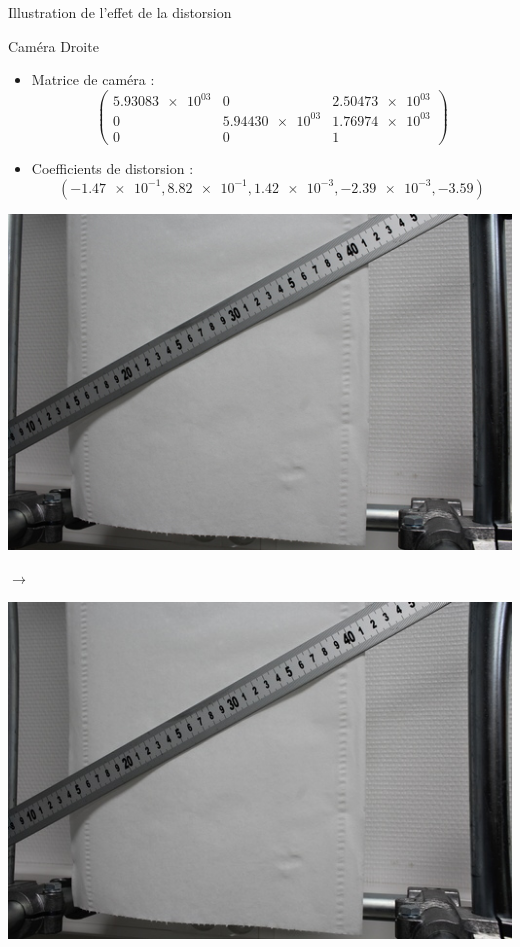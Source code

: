 \documentclass[8pt]{beamer}
\begin{document}
	\begin{frame}{Illustration de l'effet de la distorsion}\centering
		\begin{block}{Caméra Droite}
			\begin{itemize}
				\item Matrice de caméra :
				$$\begin{pmatrix}
				\num{5.93083e+03} & 0 & \num{2.50473e+03} \\
				0 & \num{5.94430e+03} & \num{1.76974e+03} \\
				0 & 0 & 1
				\end{pmatrix}$$
				\item Coefficients de distorsion :
				$$\left(
				\num{-1.47e-1}, \num{8.82e-1}, \num{1.42e-3}, \num{-2.39e-3}, \num{-3.59}
				\right)$$
			\end{itemize}
		\end{block}
		\begin{minipage}[c]{.45\textwidth}
			\includegraphics[width=\textwidth]{distorted_resized.jpg}
		\end{minipage}\hfill
		\begin{minipage}[c]{.08\textwidth}\centering
			$\longrightarrow$
		\end{minipage}\hfill
		\begin{minipage}[c]{.45\textwidth}
			\includegraphics[width=\textwidth]{regletR_undistorted_small.jpg}
		\end{minipage}
	\end{frame}
\end{document}
